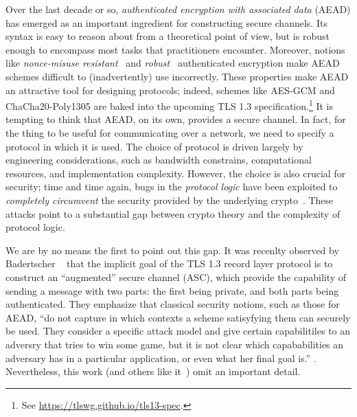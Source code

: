 Over the last decade or so, \emph{authenticated encryption with associated data}
(AEAD) has emerged as an important ingredient for constructing secure channels.
%
Its syntax is easy to reason about from a theoretical point of view, but is
robust enough to encompass most tasks that practitioners encounter. Moreover,
notions like \emph{nonce-misuse resistant}~\cite{RS07} and
\emph{robust}~\cite{HKR14} authenticated encryption make AEAD schemes difficult
to (inadvertently) use incorrectly. These properties make AEAD an attractive
tool for designing protocols; indeed, schemes like AES-GCM and
ChaCha20\mbox{-}Poly1305 are baked into the upcoming TLS 1.3
specification.\footnote{ See \url{https://tlswg.github.io/tls13-spec}.}
%
%
It is tempting to think that AEAD, on its own, provides a secure channel. In
fact, for the thing to be useful for communicating over a network, we need to
specify a protocol in which it is used. The choice of protocol is driven largely
by engineering considerations, such as bandwidth constrains, computational
resources, and implementation complexity. However, the choice is also crucial
for security; time and time again, bugs in the \emph{protocol logic} have been
exploited to \emph{completely circumvent} the security provided by the
underlying crypto~\cite{BKN02}. These attacks point to a substantial gap between
crypto theory and the complexity of protocol logic.

We are by no means the first to point out this gap. It was recenlty observed by
Badertscher \etal~\cite{BMM+15} that the implicit goal of the TLS 1.3
record layer protocol is to construct an ``augmented'' secure channel (ASC), which
provide the capability of sending a message with two parts: the first being
private, and both parts being authenticated. They emphasize that classical
security notions, such as those for AEAD, ``do not capture in which contexts a
scheme satisyfying them can securely be used. They consider a specific attack
model and give certain capabilitiles to an adversry that tries to win some game,
but it is not \apriori clear which capababilities an adversary has in a
particular application, or even what her final goal is.'' \cite[pp. 2]{BMM+15}.
Nevertheless, this work (and others like it~\cite{BKN02,PRS11}) omit an important
detail.

